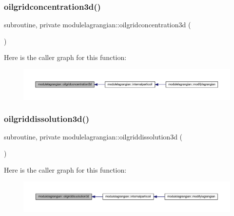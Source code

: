 \subsubsection{\texorpdfstring{oilgridconcentration3d()}{oilgridconcentration3d()}}
{\footnotesize\ttfamily subroutine, private modulelagrangian\+::oilgridconcentration3d (\begin{DoxyParamCaption}{ }\end{DoxyParamCaption})\hspace{0.3cm}{\ttfamily [private]}}

Here is the caller graph for this function\+:\nopagebreak
\begin{figure}[H]
\begin{center}
\leavevmode
\includegraphics[width=350pt]{namespacemodulelagrangian_aa09f0dae86aaba5199991f812e815936_icgraph}
\end{center}
\end{figure}
\mbox{\label{namespacemodulelagrangian_a39ff5de7cace8c7c236a47233fb2cb43}} 
\subsubsection{\texorpdfstring{oilgriddissolution3d()}{oilgriddissolution3d()}}
{\footnotesize\ttfamily subroutine, private modulelagrangian\+::oilgriddissolution3d (\begin{DoxyParamCaption}{ }\end{DoxyParamCaption})\hspace{0.3cm}{\ttfamily [private]}}

Here is the caller graph for this function\+:\nopagebreak
\begin{figure}[H]
\begin{center}
\leavevmode
\includegraphics[width=350pt]{namespacemodulelagrangian_a39ff5de7cace8c7c236a47233fb2cb43_icgraph}
\end{center}
\end{figure}
\mbox{\label{namespacemodulelagrangian_a0fa6098d248ced3df6bda0b337789166}} 
